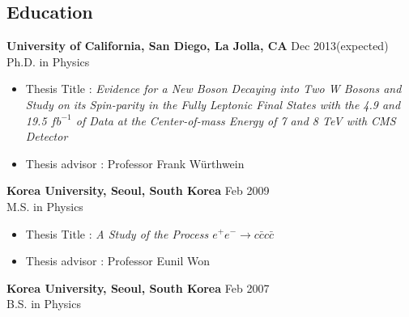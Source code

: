 \documentclass[margin]{res}
\begin{document}
\begin{resume} 


\section{Education} 
\textbf{University of California, San Diego, La Jolla, CA} \hfill  Dec 2013(expected) \\
Ph.D. in Physics \\
 \begin{itemize} \itemsep -2pt  %
 \item Thesis Title : \textit{Evidence for a New Boson Decaying into Two W Bosons
 and Study on its Spin-parity in the Fully Leptonic Final States with the  
 4.9 and 19.5 $fb^{-1}$ of Data at the Center-of-mass Energy of 7 and 8 TeV with CMS Detector}
 \item Thesis advisor : Professor Frank W\"urthwein   
 \end{itemize}

\textbf{Korea University, Seoul, South Korea} \hfill Feb 2009 \\
M.S. in Physics 
 \begin{itemize} \itemsep -2pt  %
 \item Thesis Title : \textit{A Study of the Process $e^+e^- \rightarrow c\bar{c}c\bar{c}$} 
 \item Thesis advisor : Professor Eunil Won  
 \end{itemize}
\textbf{Korea University, Seoul, South Korea} \hfill Feb 2007 \\
B.S. in Physics\\


\end{resume}
\end{document}
